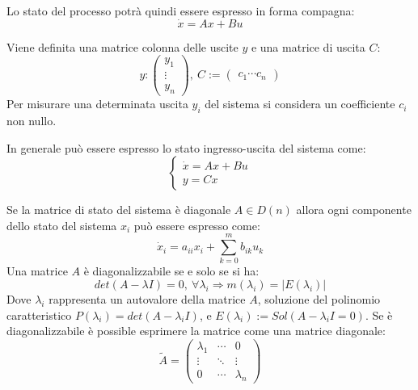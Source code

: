 \documentclass{article}
\numberwithin{equation}{subsection}
\begin{document}
Lo stato del processo potrà quindi essere espresso in forma compagna:
\begin{equation}
    \dot x=Ax+Bu
\end{equation}

Viene definita una matrice colonna delle uscite $y$ e una matrice di uscita $C$:
\begin{equation}
    y:
    \begin{pmatrix}
        y_1\\
        \vdots\\
        y_n
    \end{pmatrix}
    ,\:
    C:=
    \begin{pmatrix}
        c_1 \cdots c_n
    \end{pmatrix}
\end{equation}
Per misurare una determinata uscita $y_i$ del sistema si considera un coefficiente $c_i$ non nullo. 

In generale può essere espresso lo stato ingresso-uscita del sistema come:
\begin{equation}
    \begin{cases}
        \dot x=Ax+Bu\\
        y=Cx
    \end{cases}
\end{equation}

Se la matrice di stato del sistema è diagonale $A\in D(n)$ allora ogni componente dello stato del sistema $x_i$ può essere espresso come:
\begin{equation}
    \dot x_i=a_{ii}x_i+\displaystyle\sum_{k=0}^{m}b_{ik}u_k
\end{equation}
Una matrice $A$ è diagonalizzabile se e solo se si ha:
\begin{equation}
    det(A-\lambda I)=0,\:\forall\lambda_i\Rightarrow m(\lambda_i)=|E(\lambda_i)|
\end{equation}
Dove $\lambda_i$ rappresenta un autovalore della matrice $A$, soluzione del polinomio caratteristico $P(\lambda_i)=det(A-\lambda_iI)$, e $E(\lambda_i):=Sol(A-\lambda_iI=0)$. 
Se è diagonalizzabile è possible esprimere la matrice come una matrice diagonale:
\begin{equation}
    \tilde A=
    \begin{pmatrix}
        \lambda_1 &\cdots& 0\\
        \vdots& \ddots &\vdots\\
        0&\cdots&\lambda_n
    \end{pmatrix}
\end{equation}
\end{document}
